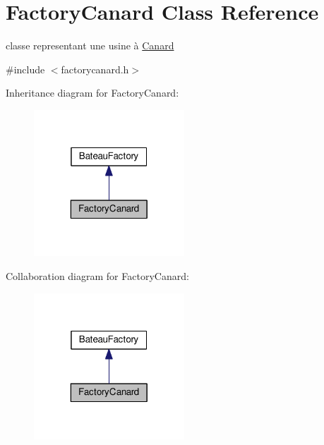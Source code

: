 \hypertarget{classFactoryCanard}{\section{Factory\+Canard Class Reference}
\label{classFactoryCanard}
}


classe representant une usine à \hyperlink{classCanard}{Canard}  




{\ttfamily \#include $<$factorycanard.\+h$>$}



Inheritance diagram for Factory\+Canard\+:
\nopagebreak
\begin{figure}[H]
\begin{center}
\leavevmode
\includegraphics[width=160pt]{classFactoryCanard__inherit__graph}
\end{center}
\end{figure}


Collaboration diagram for Factory\+Canard\+:
\nopagebreak
\begin{figure}[H]
\begin{center}
\leavevmode
\includegraphics[width=160pt]{classFactoryCanard__coll__graph}
\end{center}
\end{figure}
